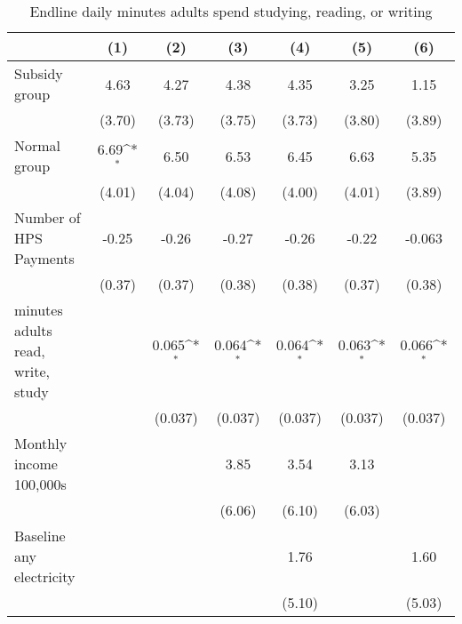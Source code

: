 \begin{table}[htbp]\centering
\def\sym#1{\ifmmode^{#1}\else\(^{#1}\)\fi}
\caption{Endline daily minutes adults spend studying, reading, or writing}
\begin{tabular*}{1\hsize}{@{\hskip\tabcolsep\extracolsep\fill}l*{6}{c}}
\toprule
                &\multicolumn{1}{c}{(1)}         &\multicolumn{1}{c}{(2)}         &\multicolumn{1}{c}{(3)}         &\multicolumn{1}{c}{(4)}         &\multicolumn{1}{c}{(5)}         &\multicolumn{1}{c}{(6)}         \\
\midrule
Subsidy group   &     4.63         &     4.27         &     4.38         &     4.35         &     3.25         &     1.15         \\
                &   (3.70)         &   (3.73)         &   (3.75)         &   (3.73)         &   (3.80)         &   (3.89)         \\
Normal group    &     6.69\sym{*}  &     6.50         &     6.53         &     6.45         &     6.63         &     5.35         \\
                &   (4.01)         &   (4.04)         &   (4.08)         &   (4.00)         &   (4.01)         &   (3.89)         \\
Number of HPS Payments&    -0.25         &    -0.26         &    -0.27         &    -0.26         &    -0.22         &   -0.063         \\
                &   (0.37)         &   (0.37)         &   (0.38)         &   (0.38)         &   (0.37)         &   (0.38)         \\
minutes adults read, write, study&                  &    0.065\sym{*}  &    0.064\sym{*}  &    0.064\sym{*}  &    0.063\sym{*}  &    0.066\sym{*}  \\
                &                  &  (0.037)         &  (0.037)         &  (0.037)         &  (0.037)         &  (0.037)         \\
Monthly income 100,000s&                  &                  &     3.85         &     3.54         &     3.13         &                  \\
                &                  &                  &   (6.06)         &   (6.10)         &   (6.03)         &                  \\
Baseline any electricity&                  &                  &                  &     1.76         &                  &     1.60         \\
                &                  &                  &                  &   (5.10)         &                  &   (5.03)         \\

\end{tabular*}
\end{table}
